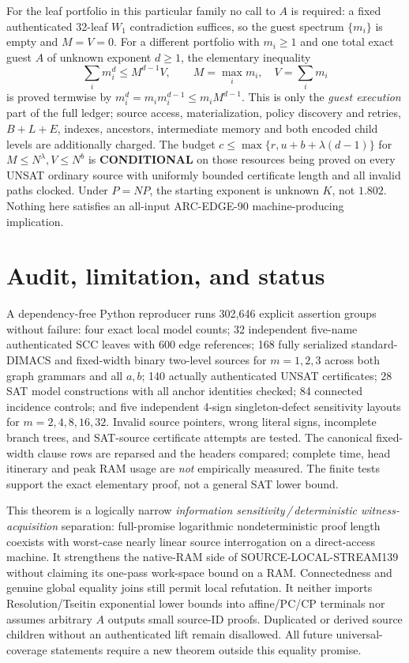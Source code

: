 \documentclass[11pt]{article}
\begin{document}
For the leaf portfolio in this particular family no call to $A$ is required: a fixed authenticated 32-leaf $W_1$ contradiction suffices, so the guest spectrum $\{m_i\}$ is empty and $M=V=0$. For a different portfolio with $m_i\ge1$ and one total exact guest $A$ of unknown exponent $d\ge1$, the elementary inequality
\[
\sum_i m_i^d\le M^{d-1}V,\qquad M=\max_i m_i,\quad V=\sum_i m_i \tag{7}
\]
is proved termwise by $m_i^d=m_i m_i^{d-1}\le m_i M^{d-1}$. This is only the \emph{guest execution} part of the full ledger; source access, materialization, policy discovery and retries, $B+L+E$, indexes, ancestors, intermediate memory and both encoded child levels are additionally charged. The budget $c\le\max\{r,u+b+\lambda(d-1)\}$ for $M\le N^\lambda,V\le N^b$ is \textbf{CONDITIONAL} on those resources being proved on every UNSAT ordinary source with uniformly bounded certificate length and all invalid paths clocked. Under $P=NP$, the starting exponent is unknown $K$, not $1.802$. Nothing here satisfies an all-input ARC-EDGE-90 machine-producing implication.

\section{Audit, limitation, and status}
A dependency-free Python reproducer runs 302,646 explicit assertion groups without failure: four exact local model counts; 32 independent five-name authenticated SCC leaves with 600 edge references; 168 fully serialized standard-DIMACS and fixed-width binary two-level sources for $m=1,2,3$ across both graph grammars and all $a,b$; 140 actually authenticated UNSAT certificates; 28 SAT model constructions with all anchor identities checked; 84 connected incidence controls; and five independent 4-sign singleton-defect sensitivity layouts for $m=2,4,8,16,32$. Invalid source pointers, wrong literal signs, incomplete branch trees, and SAT-source certificate attempts are tested. The canonical fixed-width clause rows are reparsed and the headers compared; complete time, head itinerary and peak RAM usage are \emph{not} empirically measured. The finite tests support the exact elementary proof, not a general SAT lower bound.

This theorem is a logically narrow \emph{information sensitivity\,/\,deterministic witness-acquisition} separation: full-promise logarithmic nondeterministic proof length coexists with worst-case nearly linear source interrogation on a direct-access machine. It strengthens the native-RAM side of SOURCE-LOCAL-STREAM139 without claiming its one-pass work-space bound on a RAM. Connectedness and genuine global equality joins still permit local refutation. It neither imports Resolution/Tseitin exponential lower bounds into affine/PC/CP terminals nor assumes arbitrary $A$ outputs small source-ID proofs. Duplicated or derived source children without an authenticated lift remain disallowed. All future universal-coverage statements require a new theorem outside this equality promise.
\end{document}
